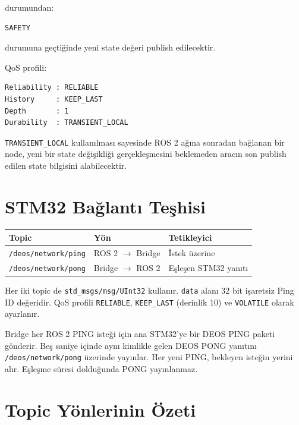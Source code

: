 \documentclass[12pt,a4paper]{article}
\begin{document}
durumundan:

\begin{verbatim}
SAFETY
\end{verbatim}

durumuna geçtiğinde yeni state değeri publish edilecektir.

QoS profili:

\begin{verbatim}
Reliability : RELIABLE
History     : KEEP_LAST
Depth       : 1
Durability  : TRANSIENT_LOCAL
\end{verbatim}

\texttt{TRANSIENT\_LOCAL} kullanılması sayesinde ROS 2 ağına sonradan
bağlanan bir node, yeni bir state değişikliği gerçekleşmesini beklemeden
aracın son publish edilen state bilgisini alabilecektir.

\section{STM32 Bağlantı Teşhisi}

\begin{tabularx}{\textwidth}{@{}l l Y@{}}
\toprule
\textbf{Topic} & \textbf{Yön} & \textbf{Tetikleyici} \\
\midrule
\texttt{/deos/network/ping} & ROS 2 $\rightarrow$ Bridge & İstek üzerine \\
\texttt{/deos/network/pong} & Bridge $\rightarrow$ ROS 2 & Eşleşen STM32 yanıtı \\
\bottomrule
\end{tabularx}

Her iki topic de \texttt{std\_msgs/msg/UInt32} kullanır.
\texttt{data} alanı 32 bit işaretsiz Ping ID değeridir.
QoS profili \texttt{RELIABLE}, \texttt{KEEP\_LAST} (derinlik 10) ve
\texttt{VOLATILE} olarak ayarlanır.

Bridge her ROS 2 PING isteği için ana STM32'ye bir DEOS PING paketi gönderir.
Beş saniye içinde aynı kimlikle gelen DEOS PONG yanıtını
\texttt{/deos/network/pong} üzerinde yayınlar. Her yeni PING, bekleyen
isteğin yerini alır. Eşleşme süresi dolduğunda PONG yayınlanmaz.

\section{Topic Yönlerinin Özeti}
\end{document}
